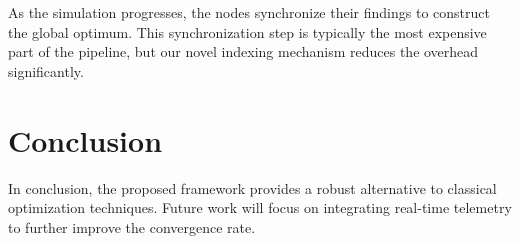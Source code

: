 \documentclass[journal]{IEEEtran}
\begin{document}
As the simulation progresses, the nodes synchronize their findings to construct the global optimum. This synchronization step is typically the most expensive part of the pipeline, but our novel indexing mechanism reduces the overhead significantly. 

\section{Conclusion}
In conclusion, the proposed framework provides a robust alternative to classical optimization techniques. Future work will focus on integrating real-time telemetry to further improve the convergence rate.
\end{document}
